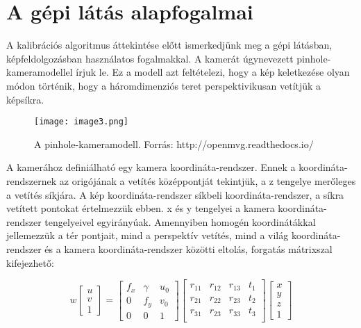 \section{A gépi látás alapfogalmai}
	A kalibrációs algoritmus áttekintése előtt ismerkedjünk meg a gépi látásban, képfeldolgozásban használatos fogalmakkal. A kamerát úgynevezett pinhole-kameramodellel írjuk le. Ez a modell azt feltételezi, hogy a kép keletkezése olyan módon történik, hogy a háromdimenziós teret perspektivikusan vetítjük a képsíkra.

\begin{figure}[H]
\centering
\texttt{[image: image3.png]}

\caption{A pinhole-kameramodell. Forrás: http://openmvg.readthedocs.io/}
\end{figure}
	
	
A kamerához definiálható egy kamera koordináta-rendszer. Ennek a koordináta-rendszernek az origójának a vetítés középpontját tekintjük, a z tengelye merőleges a vetítés síkjára. A kép koordináta-rendszer síkbeli koordináta-rendszer, a síkra vetített pontokat értelmezzük ebben. x és y tengelyei a kamera koordináta-rendszer tengelyeivel egyirányúak. Amennyiben homogén koordinátákkal jellemezzük a tér pontjait, mind a perspektív vetítés, mind a világ koordináta-rendszer és a kamera koordináta-rendszer közötti eltolás, forgatás mátrixszal kifejezhető: 

\begin{equation}
w\left[
\begin{array}{c}
u \\ v \\ 1
\end{array}
\right] = \left[ 
\begin{array}{ccc}
f_x & \gamma & u_0 \\
0 & f_y & v_0 \\
0 & 0 & 1
\end{array}
\right]\left[
\begin{array}{cccc}
r_{11} & r_{12} & r_{13} & t_1 \\
r_{21} & r_{22} & r_{23} & t_2 \\
r_{31} & r_{23} & r_{33} & t_3 \\
\end{array}
\right]\left[
\begin{array}{c}
x \\ y \\ z \\ 1
\end{array}
\right]
\end{equation}
 
